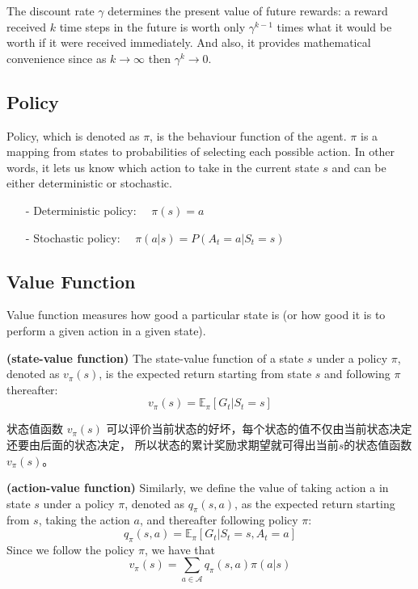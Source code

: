 The discount rate $\gamma$ determines the present value of future rewards: a 
reward received $k$ time steps in the future is worth only $\gamma^{k-1}$ times 
what it would be worth if it were received immediately. And also, it provides 
mathematical convenience since as $k\rightarrow\infty$ then $\gamma^k\rightarrow 0$.


\subsection{Policy}

Policy, which is denoted as $\pi$, is the behaviour function of the agent. $\pi$ 
is a mapping from states to probabilities of selecting each possible action. In 
other words, it lets us know which action to take in the current state $s$ and can 
be either deterministic or stochastic.

\begin{itemize}
\setlength{\parskip}{0pt}
\item[-]
Deterministic policy:
$\quad\pi(s)=a$

\item[-]
Stochastic policy: 
$\quad\pi(a|s)=P(A_t=a|S_t=s)$

\end{itemize}


\subsection{Value Function}

Value function measures how good a particular state is (or how good it is to 
perform a given action in a given state).

\begin{definition} {\rm\bf (state-value function)}
The state-value function of a state $s$ under a policy $\pi$, denoted as $v_\pi(s)$, 
is the expected return starting from state $s$ and following $\pi$ thereafter:
\begin{equation}
v_\pi(s)=\mathbb{E}_\pi[G_t|S_t=s]
\end{equation}
\end{definition}

状态值函数 $v_\pi(s)$ 可以评价当前状态的好坏，每个状态的值不仅由当前状态决定还要由后面的状态决定，
所以状态的累计奖励求期望就可得出当前$s$的状态值函数 $v_\pi(s)$。

\begin{definition} {\rm\bf (action-value function)}
Similarly, we define the value of taking action a in state $s$ under a policy $\pi$, 
denoted as $q_\pi(s,a)$, as the expected return starting from $s$, taking the 
action $a$, and thereafter following policy $\pi$:
\begin{equation}
q_\pi(s,a)=\mathbb{E}_\pi[G_t|S_t=s,A_t=a]
\end{equation}
Since we follow the policy $\pi$, we have that
\begin{equation}
v_\pi(s)=\sum_{a\in\mathcal{A}}q_\pi(s,a)\pi(a|s)
\end{equation}
\end{definition}




